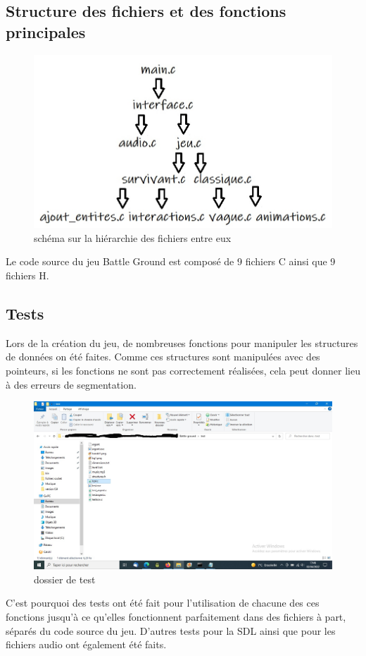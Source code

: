 \documentclass[a4paper,11pt]{article}
\begin{document}
\subsection{Structure des fichiers et des fonctions principales}
\begin{figure}[h!]
\centering
\includegraphics [width=1\textwidth]{image5.jpg} 
\caption {\label{image} schéma sur la hiérarchie des fichiers entre eux}
\end{figure}
 \smallbreak
Le code source du jeu Battle Ground est composé de 9 fichiers C ainsi que 9 fichiers H.

\subsection{Tests}
Lors de la création du jeu, de nombreuses fonctions pour manipuler les structures de données on été faites. Comme ces structures sont manipulées avec
des pointeurs, si les fonctions ne sont pas correctement réalisées, cela peut donner lieu à des erreurs de segmentation.
\begin{figure}[h!]
\centering
\includegraphics [width=1\textwidth]{image6.jpg} 
\caption {\label{image} dossier de test}
\end{figure}
 \smallbreak
C'est pourquoi des tests ont été fait pour l'utilisation de chacune des ces fonctions jusqu'à ce qu'elles fonctionnent parfaitement dans des fichiers
à part, séparés du code source du jeu.
D'autres tests pour la SDL ainsi que pour les fichiers audio ont également été faits.
\end{document}
